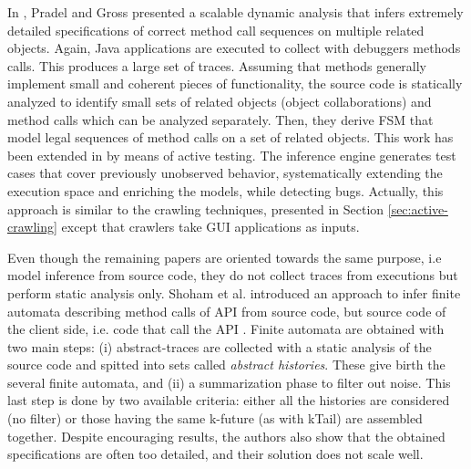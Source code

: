 In \cite{Pradel:2009}, Pradel and Gross presented a scalable
dynamic analysis that infers extremely detailed specifications of
correct method call sequences on multiple related objects. Again, Java applications are executed to collect with debuggers methods calls. This produces a large set of traces. Assuming that methods generally implement small and coherent pieces
of functionality, the source code is statically analyzed to identify small sets of
related objects (object collaborations) and method calls which
can be analyzed separately. Then, they derive FSM that model
legal sequences of method calls on a set of related objects. This work has been extended in
\cite{Dallmeier_generatingtest} by means of active testing. The inference engine generates test cases that cover previously unobserved behavior, systematically extending the execution space and enriching the models, while detecting bugs. Actually, this approach is similar to the crawling techniques, presented in Section \ref{sec:active-crawling} except that crawlers take GUI applications as inputs.

Even though the remaining papers are oriented towards the same purpose, i.e model inference from source code, they do not collect traces from executions but perform static analysis only.
Shoham et al. introduced an approach to infer finite automata describing method calls of API from source code, but source code of the client side, i.e. code that call the API \cite{Shoham:2007:SSM:1273463.1273487}. Finite automata are obtained with two main steps: (i) abstract-traces are collected with a static analysis of the source code and spitted into sets called \textit{abstract histories}. These give birth the several finite automata, and (ii) a summarization
phase to filter out noise. This last step is done by two available criteria: either all the histories are considered (no filter)  or those having the same k-future (as with kTail) are assembled together. Despite encouraging results, the authors also show that the obtained specifications are often too
detailed, and their solution does not scale well.

